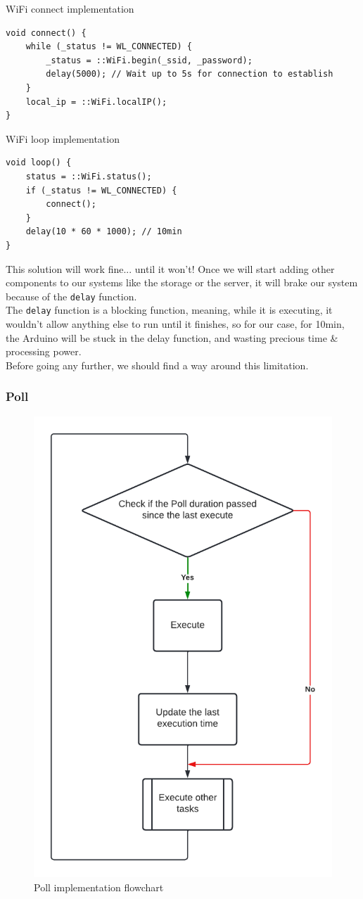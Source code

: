 \begin{code}
\caption{WiFi connect implementation}
\begin{verbatim}
void connect() {
    while (_status != WL_CONNECTED) {
        _status = ::WiFi.begin(_ssid, _password);
        delay(5000); // Wait up to 5s for connection to establish
    }
    local_ip = ::WiFi.localIP();
}
\end{verbatim}
\end{code}

\begin{code}
\caption{WiFi loop implementation}
\begin{verbatim}
void loop() {
    status = ::WiFi.status();
    if (_status != WL_CONNECTED) {
        connect();
    }
    delay(10 * 60 * 1000); // 10min
}
\end{verbatim}
\end{code}

This solution will work fine... until it won't! Once we will start adding other components to our systems like the storage or the server, it will brake our system because of the \verb|delay| function. \\
The \verb|delay| function is a blocking function, meaning, while it is executing, it wouldn't allow anything else to run until it finishes, so for our case, for 10min, the Arduino will be stuck in the delay function, and wasting precious time \& processing power. \\
Before going any further, we should find a way around this limitation.

\subsubsection{Poll}
\begin{figure}[H]
    \centering
    \includegraphics[width=.4\textwidth]{images/central/poll_flowchart.png}
    \caption{Poll implementation flowchart}
\end{figure}

